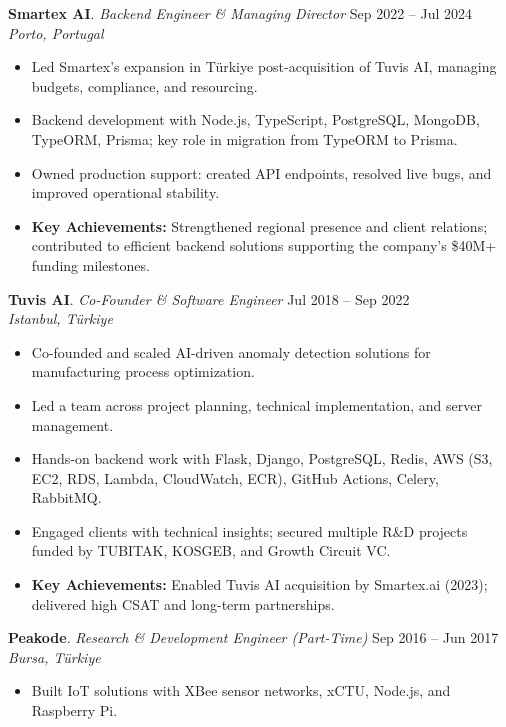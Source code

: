 \documentclass[10pt,a4paper]{extarticle}
\begin{document}
\textbf{Smartex AI}. \textit{Backend Engineer \& Managing Director} \hfill Sep 2022 -- Jul 2024\\
\textit{Porto, Portugal}
\begin{itemize}[leftmargin=*,noitemsep,topsep=0pt]
  \item Led Smartex’s expansion in Türkiye post-acquisition of Tuvis AI, managing budgets, compliance, and resourcing.
  \item Backend development with Node.js, TypeScript, PostgreSQL, MongoDB, TypeORM, Prisma; key role in migration from TypeORM to Prisma.
  \item Owned production support: created API endpoints, resolved live bugs, and improved operational stability.
  \item \textbf{Key Achievements:} Strengthened regional presence and client relations; contributed to efficient backend solutions supporting the company’s \$40M+ funding milestones.
\end{itemize}

\textbf{Tuvis AI}. \textit{Co-Founder \& Software Engineer} \hfill Jul 2018 -- Sep 2022\\
\textit{Istanbul, Türkiye}
\begin{itemize}[leftmargin=*,noitemsep,topsep=0pt]
  \item Co-founded and scaled AI-driven anomaly detection solutions for manufacturing process optimization.
  \item Led a team across project planning, technical implementation, and server management.
  \item Hands-on backend work with Flask, Django, PostgreSQL, Redis, AWS (S3, EC2, RDS, Lambda, CloudWatch, ECR), GitHub Actions, Celery, RabbitMQ.
  \item Engaged clients with technical insights; secured multiple R\&D projects funded by TUBITAK, KOSGEB, and Growth Circuit VC.
  \item \textbf{Key Achievements:} Enabled Tuvis AI acquisition by Smartex.ai (2023); delivered high CSAT and long-term partnerships.
\end{itemize}

\textbf{Peakode}. \textit{Research \& Development Engineer (Part-Time)} \hfill Sep 2016 -- Jun 2017\\
\textit{Bursa, Türkiye}
\begin{itemize}[leftmargin=*,noitemsep,topsep=0pt]
  \item Built IoT solutions with XBee sensor networks, xCTU, Node.js, and Raspberry Pi.
\end{itemize}
\end{document}
